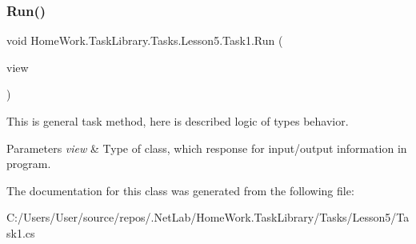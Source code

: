 \subsubsection{\texorpdfstring{Run()}{Run()}}
{\footnotesize\ttfamily void Home\+Work.\+Task\+Library.\+Tasks.\+Lesson5.\+Task1.\+Run (\begin{DoxyParamCaption}\item[{I\+Information}]{view }\end{DoxyParamCaption})}



This is general task method, here is described logic of types behavior. 


\begin{DoxyParams}{Parameters}
{\em view} & Type of class, which response for input/output information in program.\\
\hline
\end{DoxyParams}


The documentation for this class was generated from the following file\+:\begin{DoxyCompactItemize}
\item 
C\+:/\+Users/\+User/source/repos/.\+Net\+Lab/\+Home\+Work.\+Task\+Library/\+Tasks/\+Lesson5/Task1.\+cs\end{DoxyCompactItemize}
